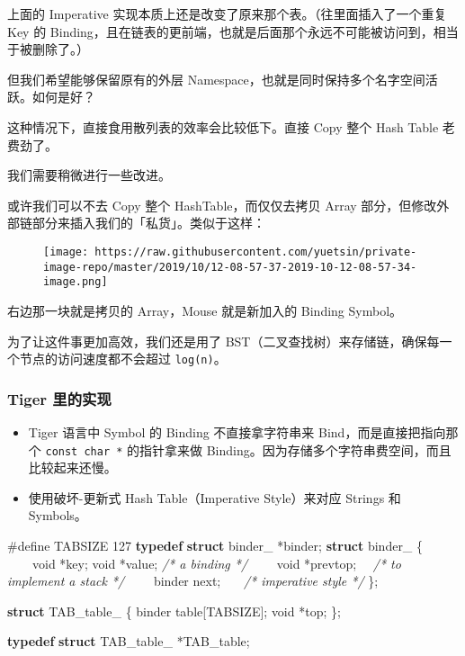 \documentclass[
]{article}
\newenvironment{Shaded}{}{}
\newcommand{\CommentTok}[1]{\textcolor[rgb]{0.38,0.63,0.69}{\textit{#1}}}
\newcommand{\DataTypeTok}[1]{\textcolor[rgb]{0.56,0.13,0.00}{#1}}
\newcommand{\DecValTok}[1]{\textcolor[rgb]{0.25,0.63,0.44}{#1}}
\newcommand{\KeywordTok}[1]{\textcolor[rgb]{0.00,0.44,0.13}{\textbf{#1}}}
\newcommand{\NormalTok}[1]{#1}
\newcommand{\PreprocessorTok}[1]{\textcolor[rgb]{0.74,0.48,0.00}{#1}}
\newcommand{\VariableTok}[1]{\textcolor[rgb]{0.10,0.09,0.49}{#1}}
\begin{document}
上面的 Imperative 实现本质上还是改变了原来那个表。（往里面插入了一个重复
Key 的
Binding，且在链表的更前端，也就是后面那个永远不可能被访问到，相当于被删除了。）

但我们希望能够保留原有的外层
Namespace，也就是同时保持多个名字空间活跃。如何是好？

这种情况下，直接食用散列表的效率会比较低下。直接 Copy 整个 Hash Table
老费劲了。

我们需要稍微进行一些改进。

或许我们可以不去 Copy 整个 HashTable，而仅仅去拷贝 Array
部分，但修改外部链部分来插入我们的「私货」。类似于这样：

\begin{figure}
\centering
\texttt{[image: https://raw.githubusercontent.com/yuetsin/private-image-repo/master/2019/10/12-08-57-37-2019-10-12-08-57-34-image.png]}
\caption{}
\end{figure}

右边那一块就是拷贝的 Array，Mouse 就是新加入的 Binding Symbol。

为了让这件事更加高效，我们还是用了
BST（二叉查找树）来存储链，确保每一个节点的访问速度都不会超过
\texttt{log(n)}。

\hypertarget{header-n75}{%
\subsubsection{Tiger 里的实现}\label{header-n75}}

\begin{itemize}
\item
  Tiger 语言中 Symbol 的 Binding 不直接拿字符串来
  Bind，而是直接把指向那个 \texttt{const\ char\ *} 的指针拿来做
  Binding。因为存储多个字符串费空间，而且比较起来还慢。
\item
  使用破坏-更新式 Hash Table（Imperative Style）来对应 Strings 和
  Symbols。
\end{itemize}

\begin{Shaded}
\begin{Highlighting}[]
\PreprocessorTok{#define TABSIZE }\DecValTok{127}
\KeywordTok{typedef} \KeywordTok{struct} \VariableTok{binder_}\NormalTok{ *binder;}
\KeywordTok{struct} \VariableTok{binder_}\NormalTok{ \{}
\NormalTok{    void *key; }\DataTypeTok{void}\NormalTok{ *value;     }\CommentTok{/* a binding */}
\NormalTok{    void *prevtop;              }\CommentTok{/* to implement a stack */}
\NormalTok{    binder next;                }\CommentTok{/* imperative style */}  
\NormalTok{\};}

\KeywordTok{struct}\NormalTok{ TAB_table_ \{}
\NormalTok{      binder table[TABSIZE];}
      \DataTypeTok{void}\NormalTok{ *top;}
\NormalTok{\};}

\KeywordTok{typedef} \KeywordTok{struct}\NormalTok{ TAB_table_ *TAB_table;     }
\end{Highlighting}
\end{Shaded}
\end{document}
